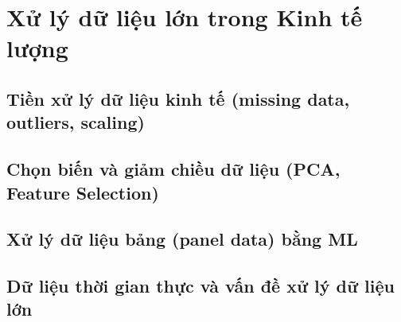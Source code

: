 \chapter{Xử lý dữ liệu lớn trong Kinh tế lượng}
\section{Tiền xử lý dữ liệu kinh tế (missing data, outliers, scaling)}
\section{Chọn biến và giảm chiều dữ liệu (PCA, Feature Selection)}
\section{Xử lý dữ liệu bảng (panel data) bằng ML}
\section{Dữ liệu thời gian thực và vấn đề xử lý dữ liệu lớn}